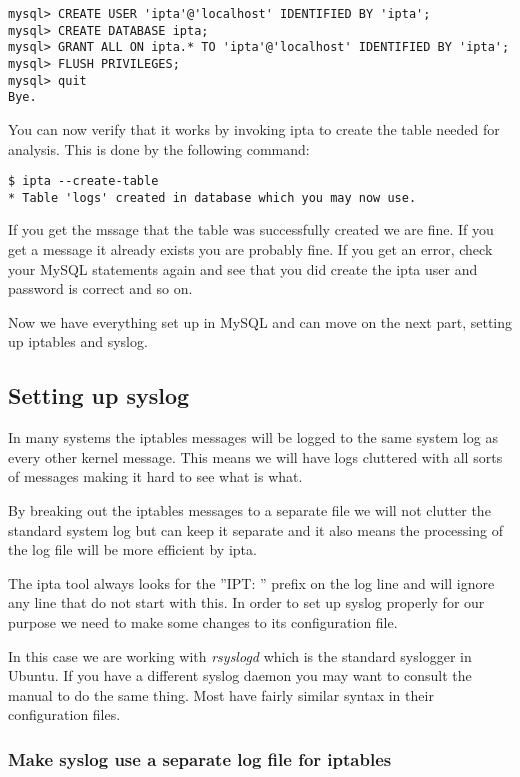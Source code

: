 \documentclass[english,twoside,openright,a4paper,12pt]{article}
\begin{document}
\small
\begin{verbatim}
mysql> CREATE USER 'ipta'@'localhost' IDENTIFIED BY 'ipta';
mysql> CREATE DATABASE ipta;
mysql> GRANT ALL ON ipta.* TO 'ipta'@'localhost' IDENTIFIED BY 'ipta';
mysql> FLUSH PRIVILEGES;
mysql> quit
Bye.
\end{verbatim}
\normalsize

You can now verify that it works by invoking ipta to create the table 
needed for analysis. This is done by the following command:

\begin{verbatim}
$ ipta --create-table
* Table 'logs' created in database which you may now use.
\end{verbatim}

If you get the mssage that the table was successfully created we are fine. If you get a message it already exists you are probably fine. If you get an error, check your MySQL statements again and see that you did create the ipta user and password is correct and so on.

Now we have everything set up in MySQL and can move on the next part, setting up iptables and syslog.

\subsection{Setting up syslog}

In many systems the iptables messages will be logged to the same system log as every other kernel message. This means we will have logs cluttered with all sorts of messages making it hard to see what is what.

By breaking out the iptables messages to a separate file we will not clutter the standard system log but can keep it separate and it also means the processing of the log file will be more efficient by ipta.

The ipta tool always looks for the ''IPT: '' prefix on the log line and will ignore any line that do not start with this. In order to set up syslog properly for our purpose we need to make some changes to its configuration file.

In this case we are working with \textit{rsyslogd} which is the standard syslogger in Ubuntu. If you have a different syslog daemon you may want to consult the manual to do the same thing. Most have fairly similar syntax in their configuration files.

\subsubsection{Make syslog use a separate log file for iptables}
\end{document}
